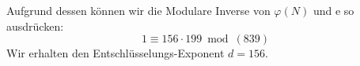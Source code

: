 %
Aufgrund dessen können wir die Modulare Inverse von $\varphi(N)$ und e so ausdrücken:
%
\begin{equation*}
 1 \equiv 156 \cdot 199 \bmod(839)
\end{equation*}
Wir erhalten den Entschlüsselungs-Exponent $d = 156$.
%
%
%
%
%
%
%
%
%
%

